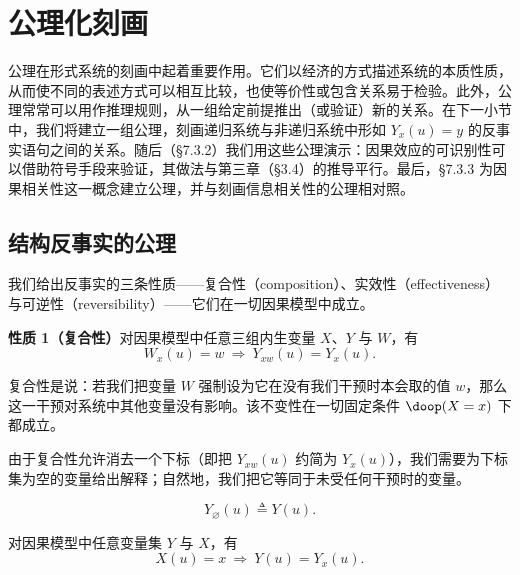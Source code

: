 \providecommand{\cfs}{\mathrel{\square\!\!\rightarrow}}

\section{公理化刻画}

公理在形式系统的刻画中起着重要作用。它们以经济的方式描述系统的本质性质，从而使不同的表述方式可以相互比较，也使等价性或包含关系易于检验。此外，公理常常可以用作推理规则，从一组给定前提推出（或验证）新的关系。在下一小节中，我们将建立一组公理，刻画递归系统与非递归系统中形如 $Y_x(u)=y$ 的反事实语句之间的关系。随后（\S 7.3.2）我们用这些公理演示：因果效应的可识别性可以借助符号手段来验证，其做法与第三章（\S 3.4）的推导平行。最后，\S 7.3.3 为因果相关性这一概念建立公理，并与刻画信息相关性的公理相对照。

\subsection{结构反事实的公理}

我们给出反事实的三条性质——复合性（composition）、实效性（effectiveness）与可逆性（reversibility）——它们在一切因果模型中成立。

\medskip
\noindent\textbf{性质 1（复合性）}\quad 对因果模型中任意三组内生变量 $X$、$Y$ 与 $W$，有
\begin{equation}
W_x(u)=w\ \Longrightarrow\ Y_{xw}(u)=Y_x(u). \tag{7.19}
\end{equation}

复合性是说：若我们把变量 $W$ 强制设为它在没有我们干预时本会取的值 $w$，那么这一干预对系统中其他变量没有影响。该不变性在一切固定条件 $\doop(X=x)$ 下都成立。

由于复合性允许消去一个下标（即把 $Y_{xw}(u)$ 约简为 $Y_x(u)$），我们需要为下标集为空的变量给出解释；自然地，我们把它等同于未受任何干预时的变量。

\begin{definition}[空行动]
\[
Y_\varnothing(u)\triangleq Y(u).
\]
\end{definition}

\begin{corollary}[一致性]
对因果模型中任意变量集 $Y$ 与 $X$，有
\begin{equation}
X(u)=x\ \Longrightarrow\ Y(u)=Y_x(u). \tag{7.20}
\end{equation}
\end{corollary}

